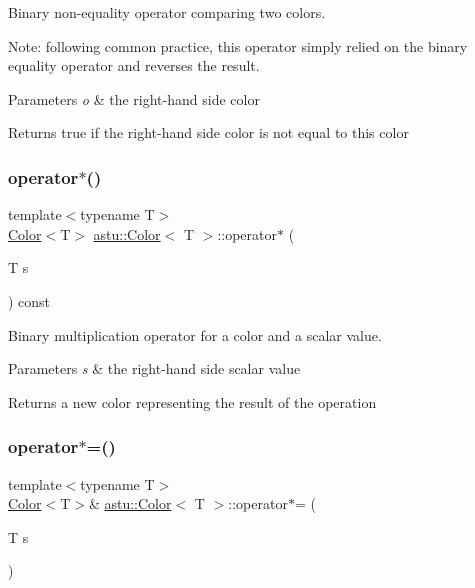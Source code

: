 Binary non-\/equality operator comparing two colors.

Note\+: following common practice, this operator simply relied on the binary equality operator and reverses the result.


\begin{DoxyParams}{Parameters}
{\em o} & the right-\/hand side color \\
\hline
\end{DoxyParams}
\begin{DoxyReturn}{Returns}
{\ttfamily true} if the right-\/hand side color is not equal to this color 
\end{DoxyReturn}
\mbox{\label{classastu_1_1Color_aa1fc446d899409058a6e510775ae009d}} 
\subsubsection{\texorpdfstring{operator$\ast$()}{operator*()}}
{\footnotesize\ttfamily template$<$typename T$>$ \\
\hyperlink{classastu_1_1Color}{Color}$<$T$>$ \hyperlink{classastu_1_1Color}{astu\+::\+Color}$<$ T $>$\+::operator$\ast$ (\begin{DoxyParamCaption}\item[{T}]{s }\end{DoxyParamCaption}) const\hspace{0.3cm}{\ttfamily [inline]}}

Binary multiplication operator for a color and a scalar value.


\begin{DoxyParams}{Parameters}
{\em s} & the right-\/hand side scalar value \\
\hline
\end{DoxyParams}
\begin{DoxyReturn}{Returns}
a new color representing the result of the operation 
\end{DoxyReturn}
\mbox{\label{classastu_1_1Color_ab097615260001619304f4d128b484359}} 
\subsubsection{\texorpdfstring{operator$\ast$=()}{operator*=()}}
{\footnotesize\ttfamily template$<$typename T$>$ \\
\hyperlink{classastu_1_1Color}{Color}$<$T$>$\& \hyperlink{classastu_1_1Color}{astu\+::\+Color}$<$ T $>$\+::operator$\ast$= (\begin{DoxyParamCaption}\item[{T}]{s }\end{DoxyParamCaption})\hspace{0.3cm}{\ttfamily [inline]}}

